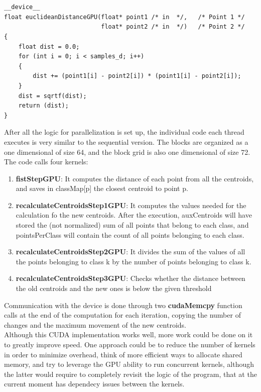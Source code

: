 \documentclass{article}
\begin{document}
\begin{lstlisting}

   
__device__
float euclideanDistanceGPU(float* point1 /* in  */,   /* Point 1 */
                           float* point2 /* in  */)   /* Point 2 */
{
	float dist = 0.0;
	for (int i = 0; i < samples_d; i++)
	{
		dist += (point1[i] - point2[i]) * (point1[i] - point2[i]);
	}
	dist = sqrtf(dist);
	return (dist);
}
\end{lstlisting}
After all the logic for parallelization is set up, the individual code each thread executes is very similar to the sequential version. The blocks are organized as a one dimensional of size 64, and the block grid is also one dimensional of size 72. The code calls four kernels:
\begin{enumerate}
    \item \textbf{fistStepGPU}: It computes the distance of each point from all the centroids, and saves in classMap[p] the closest centroid to point p.
    \item \textbf{recalculateCentroidsStep1GPU}: It computes the values needed for the calculation fo the new centroids. After the execution, auxCentroids will have stored the (not normalized) sum of all points that belong to each class, and pointsPerClass will contain the count of all points belonging to each class.
    \item \textbf{recalculateCentroidsStep2GPU}: It divides the sum of the values of all the points belonging to class k by the number of points belonging to class k.
    \item \textbf{recalculateCentroidsStep3GPU}: Checks whether the distance between the old centroids and the new ones is below the given threshold
\end{enumerate}
Communication with the device is done through two \textbf{cudaMemcpy} function calls at the end of the computation for each iteration, copying the number of changes and the maximum movement of the new centroids.\\
Although this CUDA implementation works well, more work could be done on it to greatly improve speed. One approach could be to reduce the number of kernels in order to minimize overhead, think of more efficient ways to allocate shared memory, and try to leverage the GPU ability to run concurrent kernels, although the latter would require to completely revisit the logic of the program, that at the current moment has dependecy issues between the kernels. 
\end{document}
